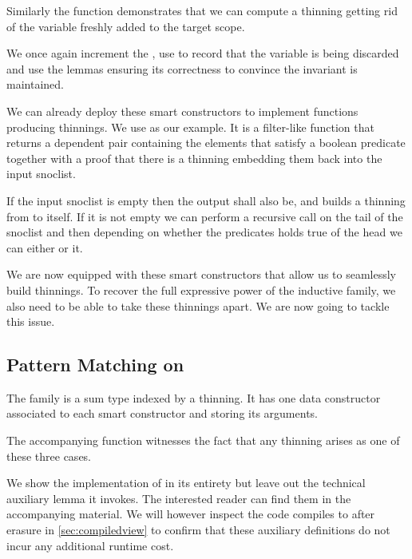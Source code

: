 Similarly the  function demonstrates that we can compute a
thinning getting rid of the variable  freshly added to the target
scope.


We once again increment the , use  to
record that the variable is being discarded and use the lemmas ensuring its
correctness to convince \idris{} the invariant is maintained.

We can already deploy these smart constructors to implement functions producing
thinnings. We use  as our example. It is a filter-like
function that returns a dependent pair
containing the elements that satisfy a boolean predicate
together with a proof that there is a thinning embedding
them back into the input snoclist.


If the input snoclist is empty then the output shall also be, and
 builds a thinning from \IdrisData{[<]} to itself.
%
If it is not empty we can perform a recursive call on the tail of the snoclist
and then depending on whether the predicates holds true of the head we can either
 or  it.


We are now equipped with these smart constructors that allow us to seamlessly
build thinnings.
%
To recover the full expressive power of the inductive family, we also need to
be able to take these thinnings apart. We are now going to tackle this issue.

\subsection{Pattern Matching on }

The  family is a sum type indexed by a thinning. It has one
data constructor associated to each smart constructor and storing its arguments.


The accompanying  function witnesses the fact that any
thinning arises as one of these three cases.


We show the implementation of  in its entirety but leave
out the technical auxiliary lemma it invokes.
%
The interested reader can find them in the accompanying material.
%
We will however inspect the code  compiles to after erasure
in \cref{sec:compiledview} to confirm that these auxiliary definitions do not
incur any additional runtime cost.

